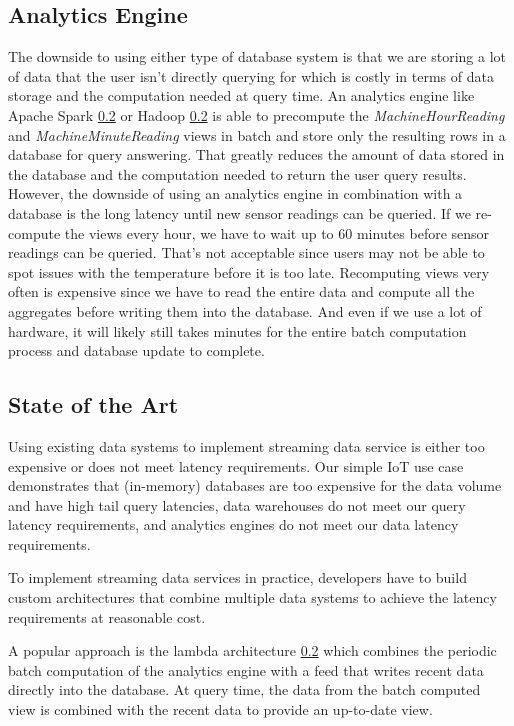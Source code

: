 \documentclass[	DIV=calc,%
							paper=letter,%
							fontsize=11pt,%
							twocolumn]{scrartcl}	 					%
\begin{document}
\subsection{Analytics Engine}

The downside to using either type of database system is that we are storing a lot of data that the user isn't directly querying for which is costly in terms of data storage and the computation needed at query time. An analytics engine like Apache Spark \ref{} or Hadoop \ref{} is able to precompute the \emph{MachineHourReading} and \emph{MachineMinuteReading} views in batch and store only the resulting rows in a database for query answering. That greatly reduces the amount of data stored in the database and the computation needed to return the user query results. However, the downside of using an analytics engine in combination with a database is the long latency until new sensor readings can be queried. If we re-compute the views every hour, we have to wait up to 60 minutes before sensor readings can be queried. That's not acceptable since users may not be able to spot issues with the temperature before it is too late. Recomputing views very often is expensive since we have to read the entire data and compute all the aggregates before writing them into the database. And even if we use a lot of hardware, it will likely still takes minutes for the entire batch computation process and database update to complete.

\subsection{State of the Art}

Using existing data systems to implement streaming data service is either too expensive or does not meet latency requirements. Our simple IoT use case demonstrates that (in-memory) databases are too expensive for the data volume and have high tail query latencies, data warehouses do not meet our query latency requirements, and analytics engines do not meet our data latency requirements.

To implement streaming data services in practice, developers have to build custom architectures that combine multiple data systems to achieve the latency requirements at reasonable cost.

A popular approach is the lambda architecture \ref{} which combines the periodic batch computation of the analytics engine with a feed that writes recent data directly into the database. At query time, the data from the batch computed view is combined with the recent data to provide an up-to-date view.
\end{document}
